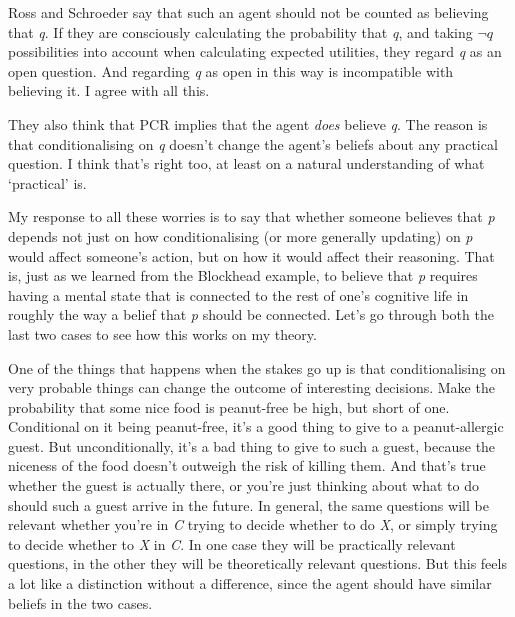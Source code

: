 Ross and Schroeder say that such an agent should not be counted as believing that \emph{q}. If they are consciously calculating the probability that \emph{q}, and taking $\neg q$ possibilities into account when calculating expected utilities, they regard \emph{q} as an open question. And regarding \emph{q} as open in this way is incompatible with believing it. I agree with all this.

They also think that PCR implies that the agent \emph{does} believe \emph{q}. The reason is that conditionalising on \emph{q} doesn't change the agent's beliefs about any practical question. I think that's right too, at least on a natural understanding of what `practical' is.

My response to all these worries is to say that whether someone believes that \emph{p} depends not just on how conditionalising (or more generally updating) on \emph{p} would affect someone's action, but on how it would affect their reasoning. That is, just as we learned from the Blockhead example, to believe that \emph{p} requires having a mental state that is connected to the rest of one's cognitive life in roughly the way a belief that \emph{p} should be connected. Let's go through both the last two cases to see how this works on my theory.

One of the things that happens when the stakes go up is that conditionalising on very probable things can change the outcome of interesting decisions. Make the probability that some nice food is peanut-free be high, but short of one. Conditional on it being peanut-free, it's a good thing to give to a peanut-allergic guest. But unconditionally, it's a bad thing to give to such a guest, because the niceness of the food doesn't outweigh the risk of killing them. And that's true whether the guest is actually there, or you're just thinking about what to do should such a guest arrive in the future. In general, the same questions will be relevant whether you're in \emph{C} trying to decide whether to do \emph{X}, or simply trying to decide whether to \emph{X} in \emph{C}. In one case they will be practically relevant questions, in the other they will be theoretically relevant questions. But this feels a lot like a distinction without a difference, since the agent should have similar beliefs in the two cases.

